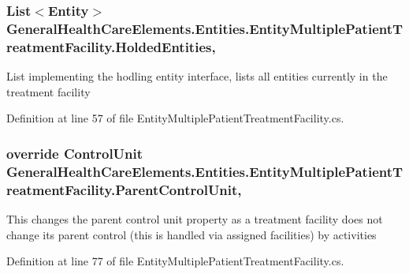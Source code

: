 \subsubsection[{\texorpdfstring{Holded\+Entities}{HoldedEntities}}]{\setlength{\rightskip}{0pt plus 5cm}List$<${\bf Entity}$>$ General\+Health\+Care\+Elements.\+Entities.\+Entity\+Multiple\+Patient\+Treatment\+Facility.\+Holded\+Entities\hspace{0.3cm}{\ttfamily [get]}, {\ttfamily [set]}}\hypertarget{class_general_health_care_elements_1_1_entities_1_1_entity_multiple_patient_treatment_facility_aaf271c862bc3cca0343650e1abb35e52}{}\label{class_general_health_care_elements_1_1_entities_1_1_entity_multiple_patient_treatment_facility_aaf271c862bc3cca0343650e1abb35e52}


List implementing the hodling entity interface, lists all entities currently in the treatment facility 



Definition at line 57 of file Entity\+Multiple\+Patient\+Treatment\+Facility.\+cs.

\subsubsection[{\texorpdfstring{Parent\+Control\+Unit}{ParentControlUnit}}]{\setlength{\rightskip}{0pt plus 5cm}override {\bf Control\+Unit} General\+Health\+Care\+Elements.\+Entities.\+Entity\+Multiple\+Patient\+Treatment\+Facility.\+Parent\+Control\+Unit\hspace{0.3cm}{\ttfamily [get]}, {\ttfamily [set]}}\hypertarget{class_general_health_care_elements_1_1_entities_1_1_entity_multiple_patient_treatment_facility_a5c49d96d9073b37443815a7046ad240b}{}\label{class_general_health_care_elements_1_1_entities_1_1_entity_multiple_patient_treatment_facility_a5c49d96d9073b37443815a7046ad240b}


This changes the parent control unit property as a treatment facility does not change its parent control (this is handled via assigned facilities) by activities 



Definition at line 77 of file Entity\+Multiple\+Patient\+Treatment\+Facility.\+cs.

